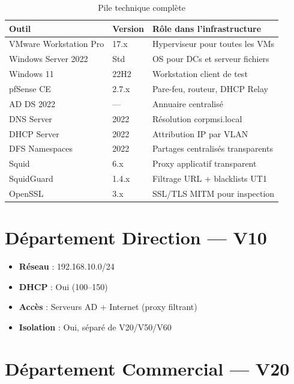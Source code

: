 \begin{table}[H]
    \centering
    \begin{tabularx}{\textwidth}{|p{2.5cm}|p{1.5cm}|p{5.5cm}|}
        \hline
        \textbf{Outil} & \textbf{Version} & \textbf{Rôle dans l'infrastructure} \\
        \hline
        VMware Workstation Pro & 17.x & Hyperviseur pour toutes les VMs \\
        \hline
        Windows Server 2022 & Std & OS pour DCs et serveur fichiers \\
        \hline
        Windows 11 & 22H2 & Workstation client de test \\
        \hline
        pfSense CE & 2.7.x & Pare-feu, routeur, DHCP Relay \\
        \hline
        AD DS 2022 & — & Annuaire centralisé \\
        \hline
        DNS Server & 2022 & Résolution corpmsi.local \\
        \hline
        DHCP Server & 2022 & Attribution IP par VLAN \\
        \hline
        DFS Namespaces & 2022 & Partages centralisés transparents \\
        \hline
        Squid & 6.x & Proxy applicatif transparent \\
        \hline
        SquidGuard & 1.4.x & Filtrage URL + blacklists UT1 \\
        \hline
        OpenSSL & 3.x & SSL/TLS MITM pour inspection \\
        \hline
    \end{tabularx}
    \caption{Pile technique complète}
    \label{tab:stack}
\end{table}

\section{Département Direction — V10}

\begin{itemize}
    \item \textbf{Réseau} : 192.168.10.0/24
    \item \textbf{DHCP} : Oui (100–150)
    \item \textbf{Accès} : Serveurs AD + Internet (proxy filtrant)
    \item \textbf{Isolation} : Oui, séparé de V20/V50/V60
\end{itemize}

\section{Département Commercial — V20}

